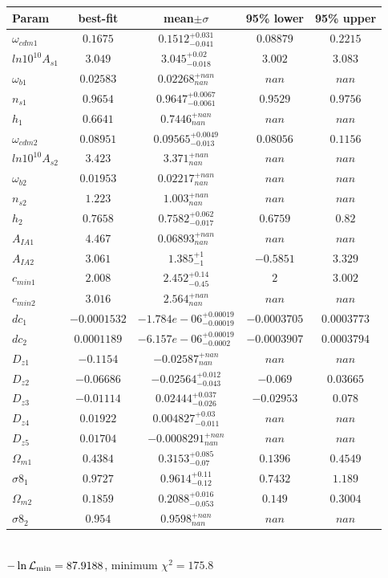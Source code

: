 \begin{tabular}{|l|c|c|c|c|} 
 \hline 
Param & best-fit & mean$\pm\sigma$ & 95\% lower & 95\% upper \\ \hline 
$\omega_{cdm 1 }$ &$0.1675$ & $0.1512_{-0.041}^{+0.031}$ & $0.08879$ & $0.2215$ \\ 
$ln10^{10}A_{s 1 }$ &$3.049$ & $3.045_{-0.018}^{+0.02}$ & $3.002$ & $3.083$ \\ 
$\omega_{b 1 }$ &$0.02583$ & $0.02268_{nan}^{+nan}$ & $nan$ & $nan$ \\ 
$n_{s 1 }$ &$0.9654$ & $0.9647_{-0.0061}^{+0.0067}$ & $0.9529$ & $0.9756$ \\ 
$h_{1 }$ &$0.6641$ & $0.7446_{nan}^{+nan}$ & $nan$ & $nan$ \\ 
$\omega_{cdm 2 }$ &$0.08951$ & $0.09565_{-0.013}^{+0.0049}$ & $0.08056$ & $0.1156$ \\ 
$ln10^{10}A_{s 2 }$ &$3.423$ & $3.371_{nan}^{+nan}$ & $nan$ & $nan$ \\ 
$\omega_{b 2 }$ &$0.01953$ & $0.02217_{nan}^{+nan}$ & $nan$ & $nan$ \\ 
$n_{s 2 }$ &$1.223$ & $1.003_{nan}^{+nan}$ & $nan$ & $nan$ \\ 
$h_{2 }$ &$0.7658$ & $0.7582_{-0.017}^{+0.062}$ & $0.6759$ & $0.82$ \\ 
$A_{IA 1 }$ &$4.467$ & $0.06893_{nan}^{+nan}$ & $nan$ & $nan$ \\ 
$A_{IA 2 }$ &$3.061$ & $1.385_{-1}^{+1}$ & $-0.5851$ & $3.329$ \\ 
$c_{min 1 }$ &$2.008$ & $2.452_{-0.45}^{+0.14}$ & $2$ & $3.002$ \\ 
$c_{min 2 }$ &$3.016$ & $2.564_{nan}^{+nan}$ & $nan$ & $nan$ \\ 
$dc_{1 }$ &$-0.0001532$ & $-1.784e-06_{-0.00019}^{+0.00019}$ & $-0.0003705$ & $0.0003773$ \\ 
$dc_{2 }$ &$0.0001189$ & $-6.157e-06_{-0.0002}^{+0.00019}$ & $-0.0003907$ & $0.0003794$ \\ 
$D_{z1 }$ &$-0.1154$ & $-0.02587_{nan}^{+nan}$ & $nan$ & $nan$ \\ 
$D_{z2 }$ &$-0.06686$ & $-0.02564_{-0.043}^{+0.012}$ & $-0.069$ & $0.03665$ \\ 
$D_{z3 }$ &$-0.01114$ & $0.02444_{-0.026}^{+0.037}$ & $-0.02953$ & $0.078$ \\ 
$D_{z4 }$ &$0.01922$ & $0.004827_{-0.011}^{+0.03}$ & $nan$ & $nan$ \\ 
$D_{z5 }$ &$0.01704$ & $-0.0008291_{nan}^{+nan}$ & $nan$ & $nan$ \\ 
$\Omega_{m 1 }$ &$0.4384$ & $0.3153_{-0.07}^{+0.085}$ & $0.1396$ & $0.4549$ \\ 
$\sigma8_{1 }$ &$0.9727$ & $0.9614_{-0.12}^{+0.11}$ & $0.7432$ & $1.189$ \\ 
$\Omega_{m 2 }$ &$0.1859$ & $0.2088_{-0.053}^{+0.016}$ & $0.149$ & $0.3004$ \\ 
$\sigma8_{2 }$ &$0.954$ & $0.9598_{nan}^{+nan}$ & $nan$ & $nan$ \\ 
\hline 
 \end{tabular} \\ 
$-\ln{\cal L}_\mathrm{min} =87.9188$, minimum $\chi^2=175.8$ \\ 
